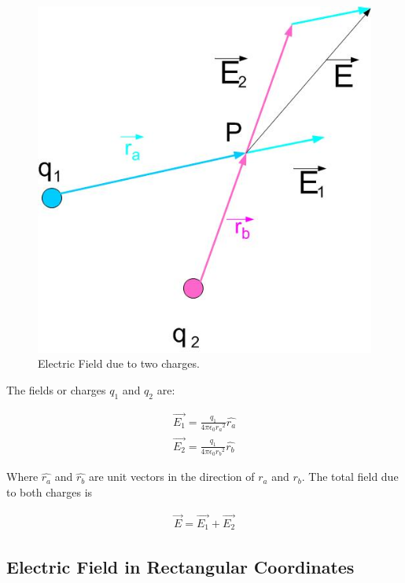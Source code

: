 \documentclass{ximera}
\begin{document}
\begin{figure}[htbp]
\begin{center}
\includegraphics[scale=0.5]{../jpg/superposition.jpg}
\end{center}
\caption{Electric Field due to two charges.}
\label{superposition}
\end{figure}

The fields or charges $q_1$ and $q_2$ are:

\begin{eqnarray}
\vec{E_1}=\frac{q_1}{4 \pi \epsilon_{0} {r_a}^2} \hat{r_a} \label{field}\\
\vec{E_2}=\frac{q_1}{4 \pi \epsilon_{0} {r_b}^2} \hat{r_b}
\end{eqnarray}

Where $\hat{r_a}$ and $\hat{r_b}$ are unit vectors in the direction of $r_a$ and $r_b$. The total field due to both charges is


\begin{eqnarray}
\vec{E}=\vec{E_1} + \vec{E_2} 
\end{eqnarray}






\subsection{Electric Field in Rectangular Coordinates}
\end{document}

